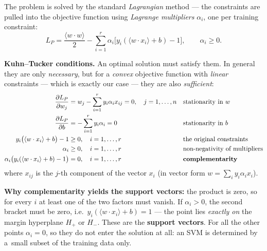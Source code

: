 \documentclass[11pt,a4paper]{article}
\theoremstyle{definition}
\begin{document}
\begin{defbox}
The problem is solved by the standard \emph{Lagrangian} method --- the constraints are pulled
into the objective function using \emph{Lagrange multipliers} $\alpha_i$, one per training
constraint:
\[ L_P=\frac{\langle w\cdot w\rangle}{2}-\sum_{i=1}^{r}\alpha_i
   \big[y_i(\langle w\cdot x_i\rangle+b)-1\big],\qquad \alpha_i\ge 0. \]

\textbf{Kuhn--Tucker conditions.} An optimal solution must satisfy them. In general they are only
\emph{necessary}, but for a \emph{convex} objective function with \emph{linear} constraints ---
which is exactly our case --- they are also \emph{sufficient}:
\begin{align*}
\frac{\partial L_P}{\partial w_j} &= w_j - \sum_{i=1}^{r} y_i\alpha_i x_{ij} = 0,
  \quad j=1,\dots,n && \text{stationarity in }w\\
\frac{\partial L_P}{\partial b} &= -\sum_{i=1}^{r} y_i\alpha_i = 0
  && \text{stationarity in }b\\
y_i\big(\langle w\cdot x_i\rangle+b\big)-1 &\ge 0, \quad i=1,\dots,r
  && \text{the original constraints}\\
\alpha_i &\ge 0, \quad i=1,\dots,r && \text{non-negativity of multipliers}\\
\alpha_i\big(y_i(\langle w\cdot x_i\rangle+b)-1\big) &= 0, \quad i=1,\dots,r
  && \text{\textbf{complementarity}}
\end{align*}
where $x_{ij}$ is the $j$-th component of the vector $x_i$ (in vector form
$w=\sum_i y_i\alpha_i x_i$).

\textbf{Why complementarity yields the support vectors:} the product is zero, so for every $i$ at
least one of the two factors must vanish. If $\alpha_i>0$, the second bracket must be zero, i.e.\
$y_i(\langle w\cdot x_i\rangle+b)=1$ --- the point lies \emph{exactly on} the margin hyperplane
$H_+$ or $H_-$. These are the \textbf{support vectors}. For all the other points $\alpha_i=0$, so
they do not enter the solution at all: an SVM is determined by a~small subset of the training data
only.


\end{defbox}
\end{document}
